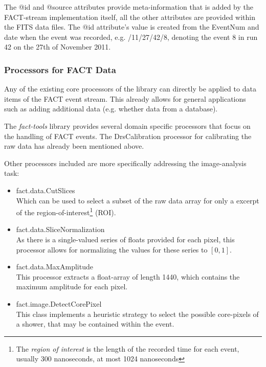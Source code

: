 The {\ttfamily @id} and {\ttfamily @source} attributes provide
meta-information that is added by the FACT-stream implementation
itself, all the other attributes are provided within the FITS data
files. The {\ttfamily @id} attribute's value is created from the
{\ttfamily EventNum} and date when the event was recorded,
e.g. {/11/27/42/8}, denoting the event 8 in run 42 on
the 27th of November 2011.


\subsubsection{Processors for FACT Data}
Any of the existing core processors of the \streams library can directly be applied
to data items of the FACT event stream. This already allows for general applications
such as adding additional data (e.g. whether data from a database).

The {\em fact-tools} library provides several domain specific processors that focus
on the handling of FACT events. The {\ttfamily DrsCalibration} processor for calibrating
the raw data has already been mentioned above.

Other processors included are more specifically addressing the image-analysis task:
\begin{itemize}
  \item {\ttfamily fact.data.CutSlices} \\
  Which can be used to select a subset of the raw data array for only a excerpt of
  the region-of-interest\footnote{The {\em region of interest} is the length of the
  recorded time for each event, usually 300 nanoseconds, at most 1024 nanoseconds} (ROI).

  \item {\ttfamily fact.data.SliceNormalization} \\
  As there is a single-valued series of floats provided for each pixel, this processor
  allows for normalizing the values for these series to $[0,1]$.

  \item {\ttfamily fact.data.MaxAmplitude} \\
  This processor extracts a float-array of length 1440, which contains the maximum
  amplitude for each pixel.

  \item {\ttfamily fact.image.DetectCorePixel} \\
  This class implements a heuristic strategy to select the possible core-pixels of
  a shower, that may be contained within the event.
\end{itemize}



